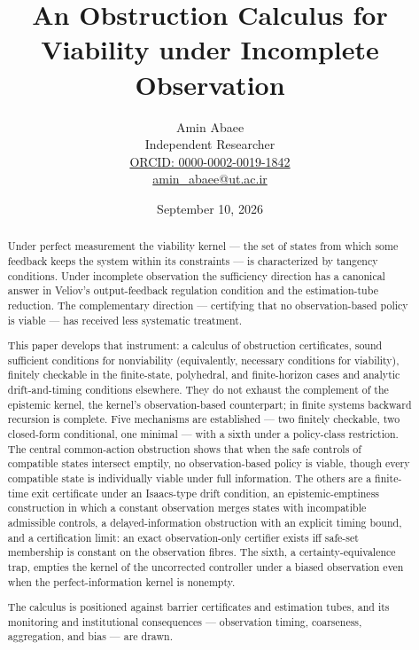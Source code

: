 \documentclass[10pt,twocolumn]{article}
\theoremstyle{definition}
\begin{document}
\title{An Obstruction Calculus for Viability under Incomplete Observation}
\author{Amin Abaee\\[0.35em]
{\small Independent Researcher}\\[0.55em]
{\small\href{https://orcid.org/0000-0002-0019-1842}{ORCID: 0000-0002-0019-1842}}\\[0.3em]
{\small\href{mailto:amin\_abaee@ut.ac.ir}{amin\_abaee@ut.ac.ir}}}
\date{September 10, 2026}
\maketitle

\begin{abstract}

Under perfect measurement the viability kernel --- the set of states
from which some feedback keeps the system within its constraints --- is
characterized by tangency conditions. Under incomplete observation the
sufficiency direction has a canonical answer in Veliov's
output-feedback regulation condition and the estimation-tube reduction.
The complementary direction --- certifying that no observation-based
policy is viable --- has received less systematic treatment.

This paper develops that instrument: a calculus of obstruction
certificates, sound sufficient conditions for nonviability (equivalently, necessary conditions for viability), finitely
checkable in the finite-state, polyhedral, and finite-horizon cases and analytic drift-and-timing conditions elsewhere. They do not exhaust the complement of the epistemic kernel, the kernel's observation-based counterpart; in finite systems backward recursion is complete. Five mechanisms are established --- two finitely checkable, two
closed-form conditional, one minimal --- with a sixth under a
policy-class restriction. The central common-action obstruction shows
that when the safe controls of compatible states intersect emptily, no
observation-based policy is viable, though every compatible state is
individually viable under full information. The others are a finite-time
exit certificate under an Isaacs-type drift condition, an
epistemic-emptiness construction in which a constant observation merges
states with incompatible admissible controls, a delayed-information
obstruction with an explicit timing bound, and a certification limit:
an exact observation-only certifier exists iff safe-set
membership is constant on the observation fibres. The sixth, a
certainty-equivalence trap, empties the kernel of the uncorrected controller under a biased
observation even when the perfect-information kernel is nonempty.

The calculus is positioned against barrier certificates and estimation
tubes, and its monitoring and institutional consequences ---
observation timing, coarseness, aggregation, and bias --- are drawn.

\end{abstract}
\end{document}
